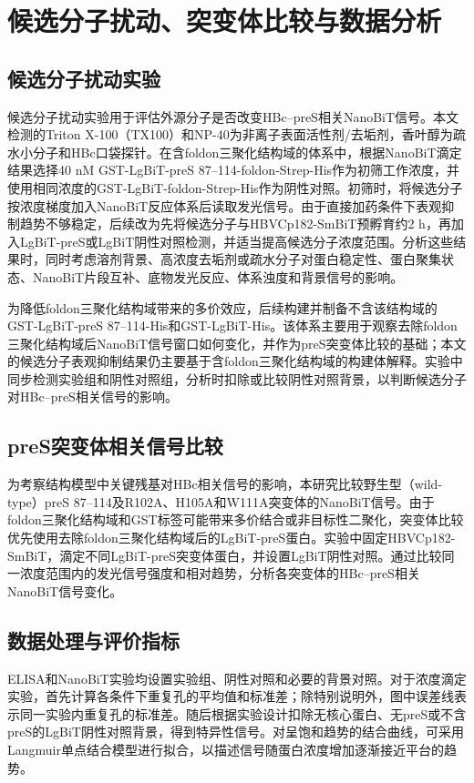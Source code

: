 \section{候选分子扰动、突变体比较与数据分析}

\subsection{候选分子扰动实验}

候选分子扰动实验用于评估外源分子是否改变HBc--preS相关NanoBiT信号。本文检测的Triton X-100（TX100）和NP-40为非离子表面活性剂/去垢剂，香叶醇为疏水小分子和HBc口袋探针。在含foldon三聚化结构域的体系中，根据NanoBiT滴定结果选择40 nM GST-LgBiT-preS 87--114-foldon-Strep-His作为初筛工作浓度，并使用相同浓度的GST-LgBiT-foldon-Strep-His作为阴性对照。初筛时，将候选分子按浓度梯度加入NanoBiT反应体系后读取发光信号。由于直接加药条件下表观抑制趋势不够稳定，后续改为先将候选分子与HBVCp182-SmBiT预孵育约2 h，再加入LgBiT-preS或LgBiT阴性对照检测，并适当提高候选分子浓度范围。分析这些结果时，同时考虑溶剂背景、高浓度去垢剂或疏水分子对蛋白稳定性、蛋白聚集状态、NanoBiT片段互补、底物发光反应、体系浊度和背景信号的影响。

为降低foldon三聚化结构域带来的多价效应，后续构建并制备不含该结构域的GST-LgBiT-preS 87--114-His和GST-LgBiT-His。该体系主要用于观察去除foldon三聚化结构域后NanoBiT信号窗口如何变化，并作为preS突变体比较的基础；本文的候选分子表观抑制结果仍主要基于含foldon三聚化结构域的构建体解释。实验中同步检测实验组和阴性对照组，分析时扣除或比较阴性对照背景，以判断候选分子对HBc--preS相关信号的影响。

\subsection{preS突变体相关信号比较}

为考察结构模型中关键残基对HBc相关信号的影响，本研究比较野生型（wild-type）preS 87--114及R102A、H105A和W111A突变体的NanoBiT信号。由于foldon三聚化结构域和GST标签可能带来多价结合或非目标性二聚化，突变体比较优先使用去除foldon三聚化结构域后的LgBiT-preS蛋白。实验中固定HBVCp182-SmBiT，滴定不同LgBiT-preS突变体蛋白，并设置LgBiT阴性对照。通过比较同一浓度范围内的发光信号强度和相对趋势，分析各突变体的HBc--preS相关NanoBiT信号变化。

\subsection{数据处理与评价指标}

ELISA和NanoBiT实验均设置实验组、阴性对照和必要的背景对照。对于浓度滴定实验，首先计算各条件下重复孔的平均值和标准差；除特别说明外，图中误差线表示同一实验内重复孔的标准差。随后根据实验设计扣除无核心蛋白、无preS或不含preS的LgBiT阴性对照背景，得到特异性信号。对呈饱和趋势的结合曲线，可采用Langmuir单点结合模型进行拟合，以描述信号随蛋白浓度增加逐渐接近平台的趋势。

